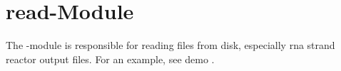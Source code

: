 \chapter{read-Module}

The -module is responsible for reading files from disk,
especially rna strand reactor output files.
For an example, see demo .
